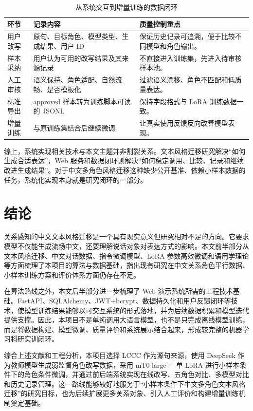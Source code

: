 \documentclass[12pt,a4paper]{ctexart}
\begin{document}
\begin{table}[H]
\centering
\caption{从系统交互到增量训练的数据闭环}
\label{tab:feedback_loop}
\begin{tabular}{p{2.4cm}|p{4.8cm}|p{5cm}}
\toprule
环节 & 记录内容 & 质量控制重点 \\
\midrule
用户改写 & 原句、目标角色、模型类型、生成结果、用户 ID & 保证历史记录可追溯，便于比较不同模型和角色输出。 \\
样本采纳 & 用户认为可用的改写结果及其来源记录 & 不直接进入训练集，先进入待审核样本池。 \\
人工审核 & 语义保持、角色适配、自然流畅、是否模板化 & 过滤语义漂移、角色不匹配和低质量表达。 \\
标准导出 & approved 样本转为训练脚本可读的 JSONL & 保持字段格式与 LoRA 训练数据一致。 \\
增量训练 & 与原训练集结合后继续微调 & 让真实使用反馈反向改善模型表现。 \\
\bottomrule
\end{tabular}
\end{table}

综上，系统实现相关技术与本文主题并非割裂关系。文本风格迁移研究解决“如何生成合适表达”，Web 服务和数据闭环则解决“如何稳定调用、比较、记录和继续改进生成结果”。对于中文多角色风格迁移这种缺少公开基准、依赖小样本数据的任务，系统化实现本身就是研究闭环的一部分。

\section{结论}

关系感知的中文文本风格迁移是一个具有现实意义但研究相对不足的方向。它要求模型不仅能生成流畅中文，还要理解说话对象对表达方式的影响。本文前半部分从文本风格迁移、中文对话数据、指令微调模型、LoRA 参数高效微调和语用学理论等方面梳理了本项目的算法与数据基础，指出现有研究在中文关系角色平行数据、小样本训练方案和评价体系方面仍存在不足。

在算法路线之外，本文后半部分进一步梳理了 Web 演示系统所需的工程技术基础。FastAPI、SQLAlchemy、JWT+bcrypt、数据持久化和用户反馈闭环等技术，使模型训练结果能够以可交互系统的形式落地，并为后续数据积累和模型迭代提供支撑。因此，本项目不是单纯调用大语言模型，也不是只完成离线模型训练，而是将数据构建、模型微调、质量评价和系统展示结合起来，形成较完整的机器学习科研实训闭环。

综合上述文献和工程分析，本项目选择 LCCC 作为源句来源，使用 DeepSeek 作为教师模型生成弱监督角色改写数据，采用 mT0-large + 单 LoRA 进行小样本条件下的角色条件微调，并通过前后端系统实现在线改写、五角色对比、多模型对比和历史记录管理。这一路线能够较好地服务于“小样本条件下中文多角色文本风格迁移”的研究目标，也为后续扩展更多关系对象、引入人工评价和构建增量训练机制奠定基础。
\end{document}
